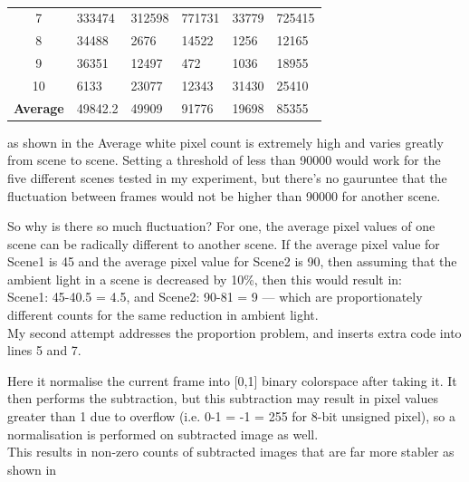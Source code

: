 \documentclass[11pt]{article} %
\begin{document}
{{\begin{center}
\begin{table}[!htbp]
\begin{center}
\begin{tabular}{| c | l | l | l | l | l | }
7	&333474	&312598	&771731	&33779	&725415\\
8	&34488	&2676	&14522	&1256	&12165\\
9	&36351	&12497	&472	&1036	&18955\\
10	&6133	&23077	&12343	&31430	&25410\\ \hline
\bf Average	&49842.2	&49909	&91776	&19698	&85355\\ \hline
	\end{tabular}
	\end{center}
	\caption{}
	\label{tab:sub1}
\end{table}
\vspace{-20pt}
\end{center}
as shown in  the Average white pixel count is extremely high and varies greatly from scene to scene. Setting a threshold of less than 90000 would work for the five different scenes tested in my experiment, but there’s no gauruntee that the fluctuation between frames would not be higher than 90000 for another scene.

So why is there so much fluctuation? For one, the average pixel values of one scene can be radically different to another scene. If the average pixel value for Scene1 is 45 and the average pixel value for Scene2 is 90, then assuming that the ambient light in a scene is decreased by 10\%, then this would result in:\\
Scene1:  45-40.5 = 4.5, and Scene2: 90-81 = 9 --- which are proportionately different counts for the same reduction in ambient light.\\
 
My second attempt addresses the proportion problem, and inserts extra code into lines 5 and 7.
\begin{frame}{}

\end{frame}
Here it normalise the current frame into [0,1] binary colorspace after taking it. It then performs the subtraction, but this subtraction may result in pixel values greater than 1 due to overflow (i.e. 0-1 = -1 = 255 for 8-bit unsigned pixel), so a normalisation is performed on subtracted image as well. \\
This results in non-zero counts of subtracted images that are far more stabler as shown in 
\begin{center}
\begin{table}[!htbp]
\centering
\begin{tabular}{| c | l | l | l | l | l | }


\end{tabular}
\end{table}
\end{center}}}
\end{document}
